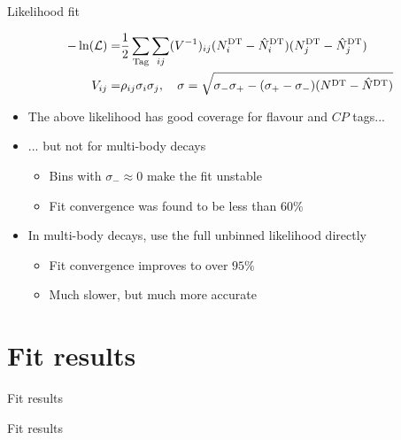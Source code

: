 \documentclass{beamer}
\begin{document}
\begin{frame}{Likelihood fit}
  \vspace{-0.5cm}
  \begin{center}
    \begin{align*}
      -\ln(\mathcal{L}) =& \frac{1}{2}\sum_{\rm Tag}\sum_{ij}(V^{-1})_{ij}(N^{\rm DT}_i - \hat{N}^{\rm DT}_i)(N^{\rm DT}_j - \hat{N}^{\rm DT}_j) \\
      V_{ij} =& \rho_{ij}\sigma_i\sigma_j, \quad \sigma = \sqrt{\sigma_-\sigma_+ - (\sigma_+ - \sigma_-)(N^{\rm DT} - \hat{N}^{\rm DT})}
    \end{align*}
  \end{center}
  \begin{itemize}
    \setlength\itemsep{1.0em}
    \item{The above likelihood has good coverage for flavour and $C\!P$ tags...}
    \item{... but not for multi-body decays}
    \begin{itemize}
      \item{Bins with $\sigma_-\approx0$ make the fit unstable}
      \item{Fit convergence was found to be less than $60\%$}
    \end{itemize}
    \item{In multi-body decays, use the full unbinned likelihood directly}
    \begin{itemize}
      \item{Fit convergence improves to over $95\%$}
      \item{Much slower, but much more accurate}
    \end{itemize}
  \end{itemize}
\end{frame}

\section{Fit results}
\begin{frame}{Fit results}
  \begin{center}
    {\huge Fit results}
  \end{center}
\end{frame}
\end{document}
